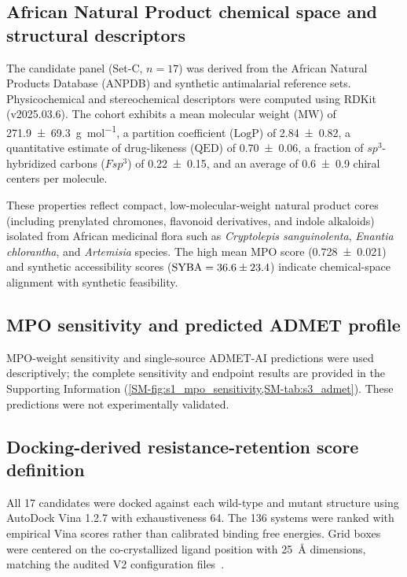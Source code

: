 \documentclass[11pt,a4paper]{article}
\begin{document}
\subsection{African Natural Product chemical space and structural descriptors}

The candidate panel (Set-C, $n=\num{17}$) was derived from the African Natural Products Database (ANPDB) and synthetic antimalarial reference sets. Physicochemical and stereochemical descriptors were computed using RDKit (v2025.03.6). The cohort exhibits a mean molecular weight ($\mathrm{MW}$) of \qty{271.9 \pm 69.3}{\g\per\mole}, a partition coefficient ($\mathrm{LogP}$) of \num{2.84 \pm 0.82}, a quantitative estimate of drug-likeness ($\mathrm{QED}$) of \num{0.70 \pm 0.06}, a fraction of $sp^3$-hybridized carbons ($Fsp^3$) of \num{0.22 \pm 0.15}, and an average of \num{0.6 \pm 0.9} chiral centers per molecule.

These properties reflect compact, low-molecular-weight natural product cores (including prenylated chromones, flavonoid derivatives, and indole alkaloids) isolated from African medicinal flora such as \textit{Cryptolepis sanguinolenta}, \textit{Enantia chlorantha}, and \textit{Artemisia} species. The high mean MPO score (\num{0.728 \pm 0.021}) and synthetic accessibility scores ($\mathrm{SYBA} = \num{36.6 \pm 23.4}$) indicate chemical-space alignment with synthetic feasibility.

\subsection{MPO sensitivity and predicted ADMET profile}

MPO-weight sensitivity and single-source ADMET-AI predictions were used descriptively; the complete sensitivity and endpoint results are provided in the Supporting Information (\cref{SM-fig:s1_mpo_sensitivity,SM-tab:s3_admet}). These predictions were not experimentally validated.

\subsection{Docking-derived resistance-retention score definition}\label{sec:rrs_formula}

All 17 candidates were docked against each wild-type and mutant structure using AutoDock Vina 1.2.7 with exhaustiveness \num{64}. The 136 systems were ranked with empirical Vina scores rather than calibrated binding free energies. Grid boxes were centered on the co-crystallized ligand position with \qty{25}{\angstrom} dimensions, matching the audited V2 configuration files~\citep{Temgoua2026}.
\end{document}
